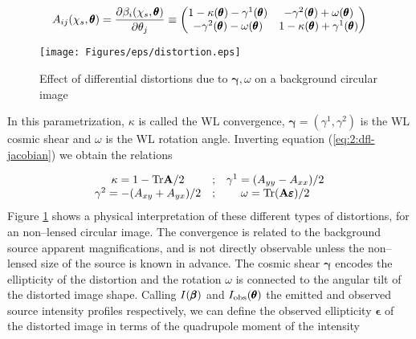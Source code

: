 \begin{equation}
\label{eq:2:dfl-jacobian}
A_{ij}(\chi_s,\pmb{\theta}) = \frac{\partial \beta_i(\chi_s,\pmb{\theta})}{\partial \theta_j} \equiv
\begin{pmatrix}
1-\kappa(\pmb{\theta})-\gamma^1(\pmb{\theta}) & -\gamma^2(\pmb{\theta})+\omega(\pmb{\theta}) \\
-\gamma^2(\pmb{\theta})-\omega(\pmb{\theta}) & 1-\kappa(\pmb{\theta})+\gamma^1(\pmb{\theta})
\end{pmatrix}
\end{equation}  
%
\begin{figure}
\begin{center}
\texttt{[image: Figures/eps/distortion.eps]}
\end{center}
\caption{Effect of differential distortions due to $\pmb{\gamma},\omega$ on a background circular image}
\label{fig:2:distortion}
\end{figure}
%
In this parametrization, $\kappa$ is called the WL convergence, $\pmb{\gamma}=(\gamma^1,\gamma^2)$ is the WL cosmic shear and $\omega$ is the WL rotation angle. Inverting equation (\ref{eq:2:dfl-jacobian}) we obtain the relations

\begin{equation}
\label{eq:2:dfl-inverse}
\begin{matrix}
\kappa = 1-{\rm Tr} \mathbf{A}/2 & ; & \gamma^1 = (A_{yy} - A_{xx})/2 \\
\gamma^2 = -(A_{xy}+A_{yx})/2 & ; & \omega = {\rm Tr} (\mathbf{A}\pmb{\varepsilon})/2
\end{matrix}
\end{equation}
% 
Figure \ref{fig:2:distortion} shows a physical interpretation of these different types of distortions, for an non--lensed circular image. The convergence is related to the background source apparent magnifications, and is not directly observable unless the non--lensed size of the source is known in advance. The cosmic shear $\pmb{\gamma}$ encodes the ellipticity of the distortion and the rotation $\omega$ is connected to the angular tilt of the distorted image shape. Calling $I(\pmb{\beta})$ and $I_{\rm obs}(\pmb{\theta})$ the emitted and observed source intensity profiles respectively, we can define the observed ellipticity $\pmb{\epsilon}$ of the distorted image in terms of the quadrupole moment of the intensity 

